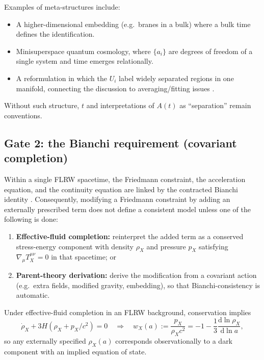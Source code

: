 \documentclass[11pt]{article}
\begin{document}
Examples of meta-structures include:
\begin{itemize}[leftmargin=1.2em]
\item A higher-dimensional embedding (e.g.\ branes in a bulk) where a bulk time defines the identification.
\item Minisuperspace quantum cosmology, where $\{a_i\}$ are degrees of freedom of a single system and time emerges relationally.
\item A reformulation in which the $U_i$ label widely separated regions in one manifold, connecting the discussion to averaging/fitting issues \citep{Buchert2000,ClarksonEtAl2011}.
\end{itemize}
Without such structure, $t$ and interpretations of $A(t)$ as ``separation'' remain conventions.

\subsection{Gate 2: the Bianchi requirement (covariant completion)}

Within a single FLRW spacetime, the Friedmann constraint, the acceleration equation, and the continuity equation are linked by the contracted Bianchi identity \citep{Wald1984}. Consequently, modifying a Friedmann constraint by adding an externally prescribed term does not define a consistent model unless one of the following is done:
\begin{enumerate}[leftmargin=1.4em]
\item \textbf{Effective-fluid completion:} reinterpret the added term as a conserved stress-energy component with density $\rho_X$ and pressure $p_X$ satisfying $\nabla_\mu T_X^{\mu\nu}=0$ in that spacetime; or
\item \textbf{Parent-theory derivation:} derive the modification from a covariant action (e.g.\ extra fields, modified gravity, embedding), so that Bianchi-consistency is automatic.
\end{enumerate}

Under effective-fluid completion in an FLRW background, conservation implies
\begin{equation}
\dot\rho_X + 3H(\rho_X+p_X/c^2)=0
\quad\Longrightarrow\quad
w_X(a):=\frac{p_X}{\rho_X c^2}
= -1-\frac{1}{3}\frac{\mathrm{d}\ln\rho_X}{\mathrm{d}\ln a},
\label{eq:wX}
\end{equation}
so any externally specified $\rho_X(a)$ corresponds observationally to a dark component with an implied equation of state.
\end{document}
